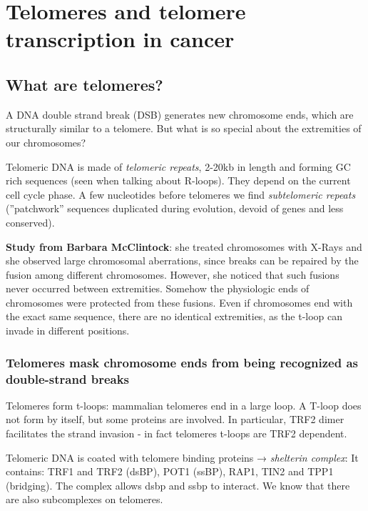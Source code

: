 \graphicspath{{chapters/_resources/}}

\chapter{Telomeres and telomere transcription in cancer}

\hypertarget{what-are-telomeres}{%
\section{What are telomeres?}\label{what-are-telomeres}}

A DNA double strand break (DSB) generates new chromosome ends, which are
structurally similar to a telomere. But what is so special about the
extremities of our chromosomes?

Telomeric DNA is made of \emph{telomeric repeats}, 2-20kb in length and
forming GC rich sequences (seen when talking about R-loops). They depend
on the current cell cycle phase. A few nucleotides before telomeres we
find \emph{subtelomeric repeats} (''patchwork'' sequences duplicated
during evolution, devoid of genes and less conserved).

\textbf{Study from Barbara McClintock}: she treated chromosomes with
X-Rays and she observed large chromosomal aberrations, since breaks can
be repaired by the fusion among different chromosomes. However, she
noticed that such fusions never occurred between extremities. Somehow
the physiologic ends of chromosomes were protected from these fusions.
Even if chromosomes end with the exact same sequence, there are no
identical extremities, as the t-loop can invade in different positions.

\hypertarget{telomeres-mask-chromosome-ends-from-being-recognized-as-double-strand-breaks}{%
\subsection{Telomeres mask chromosome ends from being recognized as double-strand breaks}\label{telomeres-mask-chromosome-ends-from-being-recognized-as-double-strand-breaks}}

Telomeres form t-loops: mammalian telomeres end in a large loop. A
T-loop does not form by itself, but some proteins are involved. In
particular, TRF2 dimer facilitates the strand invasion - in fact
telomeres t-loops are TRF2 dependent.

Telomeric DNA is coated with telomere binding proteins → \emph{shelterin
complex}: It contains: TRF1 and TRF2 (dsBP), POT1 (ssBP), RAP1, TIN2 and
TPP1 (bridging). The complex allows dsbp and ssbp to interact. We know
that there are also subcomplexes on telomeres.

